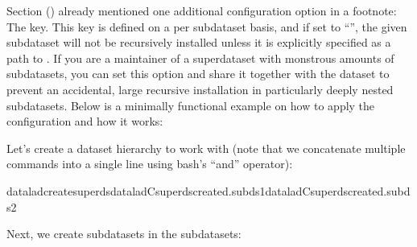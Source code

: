 \sphinxAtStartPar
Section {\hyperref[\detokenize{basics/101-116-sharelocal:sharelocal1}]{}} () already mentioned one additional configuration option in a footnote: The  key.
This key is defined on a per subdataset basis, and if set to “”, the given subdataset will not be recursively installed unless it is explicitly specified as a path to .
If you are a maintainer of a superdataset with monstrous amounts of subdatasets, you can set this option and share it together with the dataset to prevent an accidental, large recursive installation in particularly deeply nested subdatasets.
Below is a minimally functional example on how to apply the configuration and how it works:

\sphinxAtStartPar
Let’s create a dataset hierarchy to work with (note that we concatenate multiple commands into a single line using bash’s “and” \sphinxcode{\sphinxupquote{\&\&}} operator):

\begin{sphinxVerbatim}[commandchars=\\\{\}]
dataladcreatesuperdsdatalad\PYGZhy{}Csuperdscreate\PYGZhy{}d.subds1datalad\PYGZhy{}Csuperdscreate\PYGZhy{}d.subds2
\end{sphinxVerbatim}

\sphinxAtStartPar
Next, we create subdatasets in the subdatasets:

